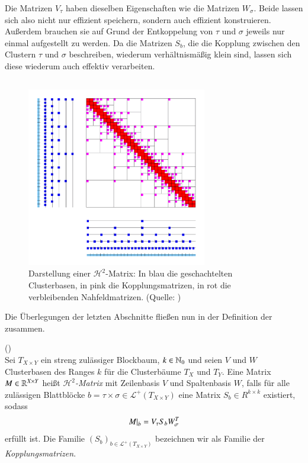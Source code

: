     Die Matrizen $V_\tau$ haben dieselben Eigenschaften wie die Matrizen $W_\sigma$. Beide lassen sich also nicht nur effizient speichern, sondern auch effizient konstruieren. Außerdem 
    brauchen sie auf Grund der Entkoppelung von $\tau$ und $\sigma$ jeweils nur einmal aufgestellt zu werden. Da die Matrizen $S_b$, die die Kopplung zwischen den Clustern 
    $\tau$ und $\sigma$ beschreiben, wiederum verhältnismäßig klein sind, lassen sich diese wiederum auch effektiv verarbeiten.
    
    \subsection{\hquad}
    \label{sec:hquad}
    
    \begin{figure}[b]
      \includegraphics[width=0.7\textwidth]{img/h2-matrix.png}
      \caption{Darstellung einer $\mathcal{H}^2$-Matrix: In blau die geschachtelten Clusterbasen, in pink die Kopplungsmatrizen, in rot die verbleibenden Nahfeldmatrizen. (Quelle: \citet{h2slides})}
      \label{fig:h2}
    \end{figure}

    
      Die Überlegungen der letzten Abschnitte fließen nun in der Definition der \hquad zusammen.
      
      \begin{defn}
	(\hquad)\\
	Sei $T_{X \times Y}$ ein streng zulässiger Blockbaum, $k \in \mathbb{N}_0$ und seien $V$ und $W$ Clusterbasen des Ranges $k$ für die Clusterbäume $T_X$ und $T_Y$. Eine Matrix 
	$M \in \mathbb{R}^{X \times Y}$ heißt \textit{$\mathcal{H}^2$-Matrix} mit Zeilenbasis $V$ und Spaltenbasis $W$, falls für alle zulässigen Blattblöcke 
	$b = \tau \times \sigma \in \mathcal{L}^+\left(T_{X \times Y}\right)$ eine Matrix $S_b \in R^{k \times k}$ existiert, sodass
	\begin{equation*}
	  \left. M \right|_b = V_\tau S_b W_\sigma^T
	\end{equation*}
	erfüllt ist. Die Familie $\left(S_b\right)_{b \in \mathcal{L}^+\left(T_{X \times Y}\right)}$ bezeichnen wir als Familie der \textit{Kopplungsmatrizen}.
      \end{defn}
      
